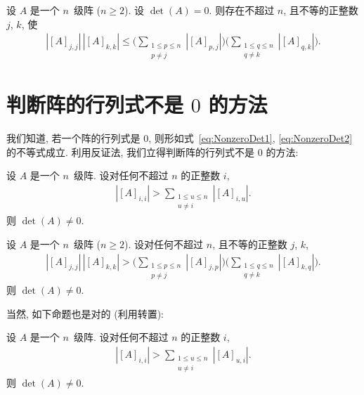 \documentclass[../libro.tex]{subfiles}
\begin{document}
\begin{theorem}
    设 \(A\) 是一个 \(n\)~级阵 (\(n \geq 2\)).
    设 \(\det {(A)} = 0\).
    则存在不超过 \(n\), 且不等的正整数 \(j\), \(k\), 使
    \begin{align*}
        |[A]_{j,j}|\,|[A]_{k,k}| \leq
        \Bigg(
            \sum_{\substack{1 \leq p \leq n \\
            p \neq j}} {|[A]_{p,j}|}
        \Bigg)
        \Bigg(
            \sum_{\substack{1 \leq q \leq n \\
            q \neq k}} {|[A]_{q,k}|}
        \Bigg).
    \end{align*}
\end{theorem}

\section{\texorpdfstring{判断阵的行列式不是 \(0\) 的方法}%
{判断阵的行列式不是 0 的方法}}

我们知道, 若一个阵的行列式是 \(0\),
则形如式~\eqref{eq:NonzeroDet1}, \eqref{eq:NonzeroDet2} 的不等式成立.
利用反证法, 我们立得判断阵的行列式不是 \(0\) 的方法:

\begin{theorem}
    设 \(A\) 是一个 \(n\)~级阵.
    设对任何不超过 \(n\) 的正整数 \(i\),
    \begin{align*}
        |[A]_{i,i}| >
        \sum_{\substack{1 \leq u \leq n \\
        u \neq i}} {|[A]_{i,u}|}.
    \end{align*}
    则 \(\det {(A)} \neq 0\).
\end{theorem}

\begin{theorem}
    设 \(A\) 是一个 \(n\)~级阵 (\(n \geq 2\)).
    设对任何不超过 \(n\), 且不等的正整数 \(j\), \(k\),
    \begin{align*}
        |[A]_{j,j}|\,|[A]_{k,k}| >
        \Bigg(
            \sum_{\substack{1 \leq p \leq n \\
            p \neq j}} {|[A]_{j,p}|}
        \Bigg)
        \Bigg(
            \sum_{\substack{1 \leq q \leq n \\
            q \neq k}} {|[A]_{k,q}|}
        \Bigg).
    \end{align*}
    则 \(\det {(A)} \neq 0\).
\end{theorem}

当然, 如下命题也是对的 (利用转置):

\begin{theorem}
    设 \(A\) 是一个 \(n\)~级阵.
    设对任何不超过 \(n\) 的正整数 \(i\),
    \begin{align*}
        |[A]_{i,i}| >
        \sum_{\substack{1 \leq u \leq n \\
        u \neq i}} {|[A]_{u,i}|}.
    \end{align*}
    则 \(\det {(A)} \neq 0\).
\end{theorem}
\end{document}
